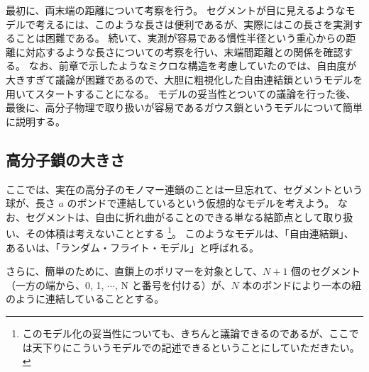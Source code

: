 \documentclass[uplatex,dvipdfmx,a4paper,11pt, titlepage]{jsarticle}
\begin{document}
最初に、両末端の距離について考察を行う。
セグメントが目に見えるようなモデルで考えるには、このような長さは便利であるが、実際にはこの長さを実測することは困難である。
続いて、実測が容易である慣性半径という重心からの距離に対応するような長さについての考察を行い、末端間距離との関係を確認する。
なお、前章で示したようなミクロな構造を考慮していたのでは、自由度が大きすぎて議論が困難であるので、大胆に粗視化した自由連結鎖というモデルを用いてスタートすることになる。
モデルの妥当性とついての議論を行った後、最後に、高分子物理で取り扱いが容易であるガウス鎖というモデルについて簡単に説明する。

%


\subsection{高分子鎖の大きさ}

ここでは、実在の高分子のモノマー連鎖のことは一旦忘れて、セグメントという球が、長さ $a$ のボンドで連結しているという仮想的なモデルを考えよう。
なお、セグメントは、自由に折れ曲がることのできる単なる結節点として取り扱い、その体積は考えないこととする
\footnote
{
このモデル化の妥当性についても、きちんと議論できるのであるが、ここでは天下りにこういうモデルでの記述できるということにしていただきたい。
}。
このようなモデルは、「自由連結鎖」、あるいは、「ランダム・フライト・モデル」と呼ばれる。

さらに、簡単のために、直鎖上のポリマーを対象として、$N+1$ 個のセグメント（一方の端から、0, 1, $\cdots$, N と番号を付ける）が、$N$ 本のボンドにより一本の紐のように連結していることとする。
\end{document}
